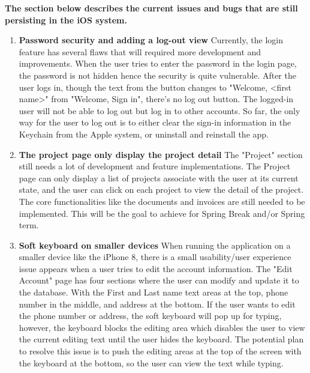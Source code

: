 \documentclass[onecolumn, draftclsnofoot,10pt, compsoc]{IEEEtran}
\begin{document}
\begin{flushleft}
\textbf{The section below describes the current issues and bugs that are still persisting in the iOS system.} \newline

\begin{enumerate}
  \item \textbf{Password security and adding a log-out view}\newline 
  Currently, the login feature has several flaws that will required more development and improvements. When the user tries to enter the password in the login page, the password is not hidden hence the security is quite vulnerable. After the user logs in, though the text from the button changes to "Welcome, <first name>" from "Welcome, Sign in", there's no log out button. The logged-in user will not be able to log out but log in to other accounts. So far, the only way for the user to log out is to either clear the sign-in information in the Keychain from the Apple system, or uninstall and reinstall the app. \newline
  
  \item \textbf{The project page only display the project detail}\newline 
  The "Project" section still needs a lot of development and feature implementations. The Project page can only display a list of projects associate with the user at its current state, and the user can click on each project to view the detail of the project. The core functionalities like the documents and invoices are still needed to be implemented. This will be the goal to achieve for Spring Break and/or Spring term.\newline
  
  \item \textbf{Soft keyboard on smaller devices}\newline 
  When running the application on a smaller device like the iPhone 8, there is a small usability/user experience issue appears when a user tries to edit the account information. The "Edit Account" page has four sections where the user can modify and update it to the database. With the First and Last name text areas at the top, phone number in the middle, and address at the bottom. If the user wants to edit the phone number or address, the soft keyboard will pop up for typing, however, the keyboard blocks the editing area which disables the user to view the current editing text until the user hides the keyboard. The potential plan to resolve this issue is to push the editing areas at the top of the screen with the keyboard at the bottom, so the user can view the text while typing.\newline
\end{enumerate}

\end{flushleft}
\end{document}
